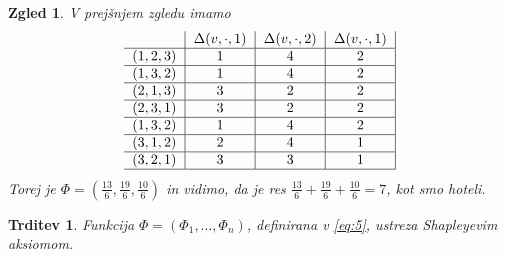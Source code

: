 \documentclass[10pt, a4paper]{article}
\newtheorem{trditev}[izr]{Trditev}
\newtheorem{zgled}[izr]{Zgled}
\begin{document}
\begin{zgled}
  V prejšnjem zgledu imamo 
  $$
    {\begin{tabular}{c|c|c|c|}
        & $\Delta(v,\cdot, 1)$ & $\Delta(v,\cdot, 2)$ & $\Delta(v,\cdot, 1)$\\
        \hline
        $(1, 2, 3)$ & 1 & 4 & 2\\
        \hline
        $(1, 3, 2)$ & 1 & 4 & 2\\
        \hline
        $(2, 1, 3)$ & 3 & 2 & 2\\
        \hline
        $(2, 3, 1)$ & 3 & 2 & 2\\
        \hline
        $(1, 3, 2)$ & 1 & 4 & 2\\
        \hline
        $(3, 1, 2)$ & 2 & 4 & 1\\
        \hline 
        $(3, 2, 1)$ & 3 & 3 & 1\\
        \hline
    \end{tabular}}        
  $$    
    Torej je $\Phi = \left(\frac{13}{6}, \frac{19}{6}, \frac{10}{6}\right)$ in vidimo, da je res $\frac{13}{6}+\frac{19}{6}+\frac{10}{6} = 7$,
    kot smo hoteli.
\end{zgled}

\begin{trditev}
  Funkcija $\Phi = (\Phi_1, \dots, \Phi_n)$, definirana v \eqref{eq:5}, ustreza Shapleyevim aksiomom.
\end{trditev}
\end{document}
